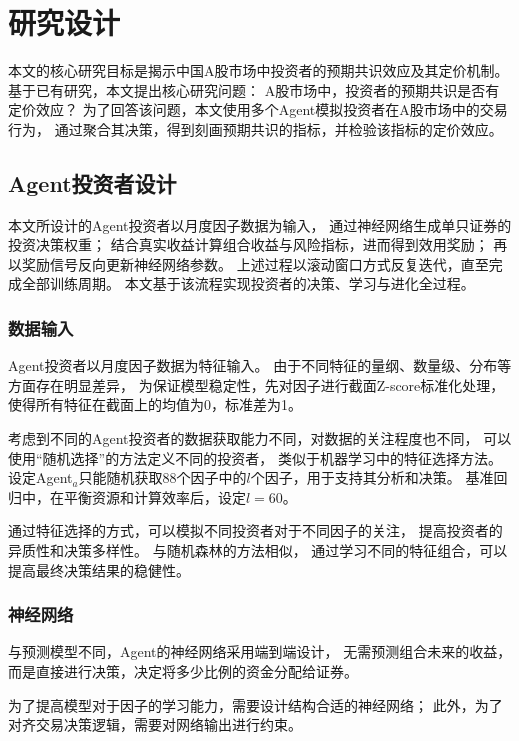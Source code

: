 
\chapter{研究设计}

本文的核心研究目标是揭示中国A股市场中投资者的预期共识效应及其定价机制。
基于已有研究，本文提出核心研究问题：
A股市场中，投资者的预期共识是否有定价效应？
为了回答该问题，本文使用多个Agent模拟投资者在A股市场中的交易行为，
通过聚合其决策，得到刻画预期共识的指标，并检验该指标的定价效应。

\section{Agent投资者设计}  

本文所设计的Agent投资者以月度因子数据为输入，
通过神经网络生成单只证券的投资决策权重；
结合真实收益计算组合收益与风险指标，进而得到效用奖励；
再以奖励信号反向更新神经网络参数。
上述过程以滚动窗口方式反复迭代，直至完成全部训练周期。
本文基于该流程实现投资者的决策、学习与进化全过程。

\subsection{数据输入}

Agent投资者以月度因子数据为特征输入。
由于不同特征的量纲、数量级、分布等方面存在明显差异，
为保证模型稳定性，先对因子进行截面Z-score标准化处理，
使得所有特征在截面上的均值为0，标准差为1。

考虑到不同的Agent投资者的数据获取能力不同，对数据的关注程度也不同，
可以使用“随机选择”的方法定义不同的投资者\cite{bali2023machine}，
类似于机器学习中的特征选择方法\cite{breiman2001random}。
设定Agent$_a$只能随机获取88个因子中的$l$个因子，用于支持其分析和决策。
基准回归中，在平衡资源和计算效率后，设定$l=60$。

通过特征选择的方式，可以模拟不同投资者对于不同因子的关注，
提高投资者的异质性和决策多样性。
与随机森林的方法相似，
通过学习不同的特征组合，可以提高最终决策结果的稳健性。

\subsection{神经网络}

与预测模型不同，Agent的神经网络采用端到端设计，
无需预测组合未来的收益，而是直接进行决策，决定将多少比例的资金分配给证券。

为了提高模型对于因子的学习能力，需要设计结构合适的神经网络；
此外，为了对齐交易决策逻辑，需要对网络输出进行约束。

